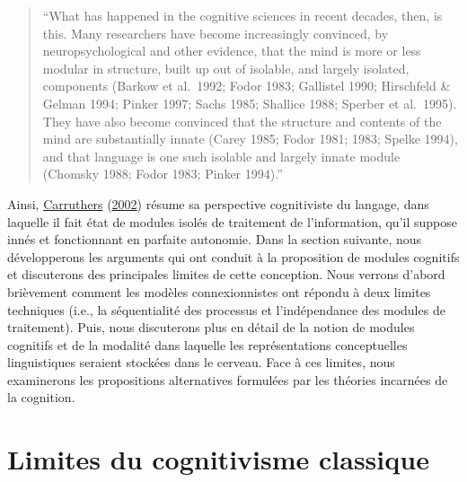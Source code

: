 \documentclass[
  a4paper,12pt,twoside,onecolumn,openright,final,oldfontcommands]{memoir}
\begin{document}
\begin{quote}
``What has happened in the cognitive sciences in recent decades, then, is this. Many researchers have become increasingly convinced, by neuropsychological and other evidence, that the mind is more or less modular in structure, built up out of isolable, and largely isolated, components (Barkow et al.~1992; Fodor 1983; Gallistel 1990; Hirschfeld \& Gelman 1994; Pinker 1997; Sachs 1985; Shallice 1988; Sperber et al.~1995). They have also become convinced that the structure and contents of the mind are substantially innate (Carey 1985; Fodor 1981; 1983; Spelke 1994), and that language is one such isolable and largely innate module (Chomsky 1988; Fodor 1983; Pinker 1994).''
\end{quote}

Ainsi, \protect\hyperlink{ref-carruthers_cognitive_2002}{Carruthers} (\protect\hyperlink{ref-carruthers_cognitive_2002}{2002}) résume sa perspective cognitiviste du langage, dans laquelle il fait état de modules isolés de traitement de l'information, qu'il suppose innés et fonctionnant en parfaite autonomie. Dans la section suivante, nous développerons les arguments qui ont conduit à la proposition de modules cognitifs et discuterons des principales limites de cette conception. Nous verrons d'abord brièvement comment les modèles connexionnistes ont répondu à deux limites techniques (i.e., la séquentialité des processus et l'indépendance des modules de traitement). Puis, nous discuterons plus en détail de la notion de modules cognitifs et de la modalité dans laquelle les représentations conceptuelles linguistiques seraient stockées dans le cerveau. Face à ces limites, nous examinerons les propositions alternatives formulées par les théories incarnées de la cognition.

\hypertarget{limites-du-cognitivisme-classique}{%
\section{Limites du cognitivisme classique}\label{limites-du-cognitivisme-classique}}
\end{document}
